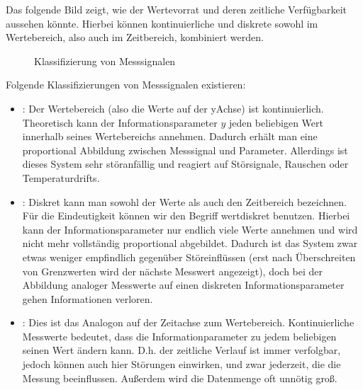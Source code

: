 \documentclass[letterpaper,10pt,english]{jupyterBook}
\let\sphinxpxdimen\pdfpxdimen\else\newdimen\sphinxpxdimen
\begin{document}
\sphinxAtStartPar
Das folgende Bild zeigt, wie der Wertevorrat und deren zeitliche Verfügbarkeit aussehen könnte. Hierbei können kontinuierliche und diskrete sowohl im Wertebereich, also auch im Zeitbereich, kombiniert werden.

\begin{figure}[htbp]
\centering
\capstart

\noindent\sphinxincludegraphics[width=500\sphinxpxdimen]{{klassifizierung_signal}.jpg}
\caption{Klassifizierung von Messsignalen}\label{\detokenize{content/3_basics:klassifizierung-signal}}\end{figure}

\sphinxAtStartPar
Folgende Klassifizierungen von Messsignalen existieren:
\begin{itemize}
\item {} 
\sphinxAtStartPar
{}: Der Wertebereich (also die Werte auf der y\sphinxhyphen{}Achse) ist kontinuierlich. Theoretisch kann der Informationsparameter \(y\) jeden beliebigen Wert innerhalb seines Wertebereichs annehmen. Dadurch erhält man eine proportional Abbildung zwischen Messsignal und Parameter. Allerdings ist dieses System sehr störanfällig und reagiert auf Störsignale, Rauschen oder Temperaturdrifts.

\item {} 
\sphinxAtStartPar
{}: Diskret kann man sowohl der Werte\sphinxhyphen{} als auch den Zeitbereich bezeichnen. Für die Eindeutigkeit können wir den Begriff wertdiskret benutzen. Hierbei kann der Informationsparameter nur endlich viele Werte annehmen und wird nicht mehr vollständig proportional abgebildet. Dadurch ist das System zwar etwas weniger empfindlich gegenüber Störeinflüssen (erst nach Überschreiten von Grenzwerten wird der nächste  Messwert angezeigt), doch bei der Abbildung analoger Messwerte auf einen diskreten Informationsparameter gehen Informationen verloren.

\item {} 
\sphinxAtStartPar
{}: Dies ist das Analogon auf der Zeitachse zum  Wertebereich. Kontinuierliche Messwerte bedeutet, dass die Informationparameter zu jedem beliebigen  seinen Wert ändern kann. D.h. der zeitliche Verlauf ist immer verfolgbar, jedoch können auch hier Störungen einwirken, und zwar jederzeit, die die Messung beeinflussen. Außerdem wird die Datenmenge oft unnötig groß.


\end{itemize}
\end{document}
